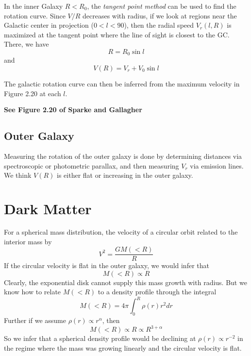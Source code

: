 \documentclass[]{article}
\begin{document}
In the inner Galaxy $R<R_0$, the {\it tangent point method} can be
used to find the rotation curve.  Since $V/R$ decreases with
radius, if we look at regions near the Galactic center in projection
($0<l<90$), then the radial speed $V_r(l,R)$ is maximized at the
tangent point where the
line of sight is closest to the GC.  There, we have
\begin{equation}
R = R_0 \sin l
\end{equation}
\noindent
and
\begin{equation}
V(R) = V_r + V_0 \sin l
\end{equation}

The galactic rotation curve can then be inferred from
the maximum velocity in Figure 2.20 at each $l$.

{\bf See Figure 2.20 of Sparke and Gallagher}

\subsection{Outer Galaxy}

Measuring the rotation of the outer galaxy is done by
determining distances via spectroscopic or photometric
parallax, and then measuring $V_r$ via emission lines.
We think $V(R)$ is either flat or increasing in the
outer galaxy.


\section{Dark Matter}

For a spherical mass distribution, the velocity of
a circular orbit related to the interior mass by
\begin{equation}
V^2 = \frac{GM(<R)}{R}
\end{equation}
\noindent
If the circular velocity is flat in the outer 
galaxy, we would infer that
\begin{equation}
M(<R) \propto R
\end{equation}
\noindent
Clearly, the exponential disk cannot supply
this mass growth with radius.
But we know how to relate $M(<R)$ to a density
profile through the integral
\begin{equation}
M(<R) = 4\pi\int_0^{R}\rho(r)r^{2}dr
\end{equation}
\noindent
Further if we assume $\rho(r)\propto r^{\alpha}$,
then
\begin{equation}
M(<R) \propto R \propto R^{3 + \alpha}
\end{equation}
\noindent
So we infer that a spherical density profile would 
be declining at $\rho(r)\propto r^{-2}$ in the
regime where the mass was growing linearly and
the circular velocity is flat.
\end{document}
